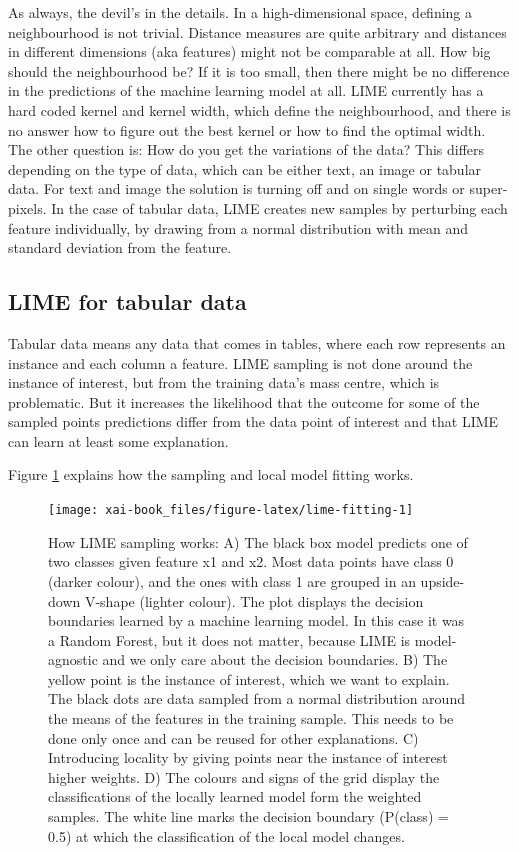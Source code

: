 \documentclass[12pt,]{krantz}
\theoremstyle{definition}
\theoremstyle{definition}
\theoremstyle{definition}
\theoremstyle{remark}
\begin{document}
As always, the devil's in the details. In a high-dimensional space,
defining a neighbourhood is not trivial. Distance measures are quite
arbitrary and distances in different dimensions (aka features) might not
be comparable at all. How big should the neighbourhood be? If it is too
small, then there might be no difference in the predictions of the
machine learning model at all. LIME currently has a hard coded kernel
and kernel width, which define the neighbourhood, and there is no answer
how to figure out the best kernel or how to find the optimal width. The
other question is: How do you get the variations of the data? This
differs depending on the type of data, which can be either text, an
image or tabular data. For text and image the solution is turning off
and on single words or super-pixels. In the case of tabular data, LIME
creates new samples by perturbing each feature individually, by drawing
from a normal distribution with mean and standard deviation from the
feature.

\subsection{LIME for tabular data}\label{lime-for-tabular-data}

Tabular data means any data that comes in tables, where each row
represents an instance and each column a feature. LIME sampling is not
done around the instance of interest, but from the training data's mass
centre, which is problematic. But it increases the likelihood that the
outcome for some of the sampled points predictions differ from the data
point of interest and that LIME can learn at least some explanation.

Figure \ref{fig:lime-fitting} explains how the sampling and local model
fitting works.

\begin{figure}

{\centering \texttt{[image: xai-book\_files/figure-latex/lime-fitting-1]} 

}

\caption{How LIME sampling works: A) The black box model predicts one of two classes given feature x1 and x2. Most data points have class 0 (darker colour), and the ones with class 1 are grouped in an upside-down V-shape (lighter colour). The plot displays the decision boundaries learned by a machine learning model. In this case it was a Random Forest, but it does not matter, because LIME is model-agnostic and we only care about the decision boundaries. B) The yellow point is the instance of interest, which we want to explain. The black dots are data sampled from a normal distribution around the means of the features in the training sample. This needs to be done only once and can be reused for other explanations. C) Introducing locality by giving points near the instance of interest higher weights. D) The colours and signs of the grid display the classifications of the locally learned model form the weighted samples. The white line marks the decision boundary (P(class) = 0.5) at which the classification of the local model changes.}\label{fig:lime-fitting}
\end{figure}
\end{document}
